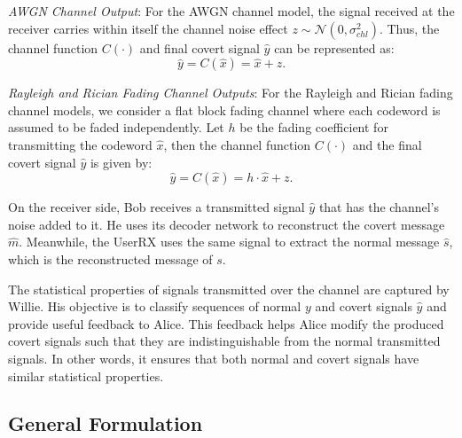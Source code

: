\textit{AWGN Channel Output}: For the AWGN channel model, the signal received at the receiver carries within itself the channel noise effect \(z \sim \mathcal{N}(0, \sigma_{chl}^2)\). Thus, the channel function \(C(\cdot)\) and final covert signal \(\hat{y}\) can be represented as:
\begin{equation}
	\hat{y} = C(\hat{x}) = \hat{x} + z.
\end{equation}


\textit{Rayleigh and Rician Fading Channel Outputs}: For the Rayleigh and Rician fading channel models, we consider a flat block fading channel where each codeword is assumed to be faded independently. Let \(h\) be the fading coefficient for transmitting the codeword \(\hat{x}\), then the channel function \(C(\cdot)\) and the final covert signal \(\hat{y}\) is given by:
\begin{equation}
	\hat{y} = C(\hat{x}) = h \cdot \hat{x} + z.
\end{equation}


On the receiver side, Bob receives a transmitted signal \(\hat{y}\) that has the channel's noise added to it. He uses its decoder network to reconstruct the covert message \(\hat{m}\). Meanwhile, the UserRX uses the same signal to extract the normal message \(\hat{s}\), which is the reconstructed message of \(s\).


The statistical properties of signals transmitted over the channel are captured by Willie. His objective is to classify sequences of normal \(y\) and covert signals \(\hat{y}\) and provide useful feedback to Alice. This feedback helps Alice modify the produced covert signals such that they are indistinguishable from the normal transmitted signals. In other words, it ensures that both normal and covert signals have similar statistical properties.


\subsection{General Formulation}


